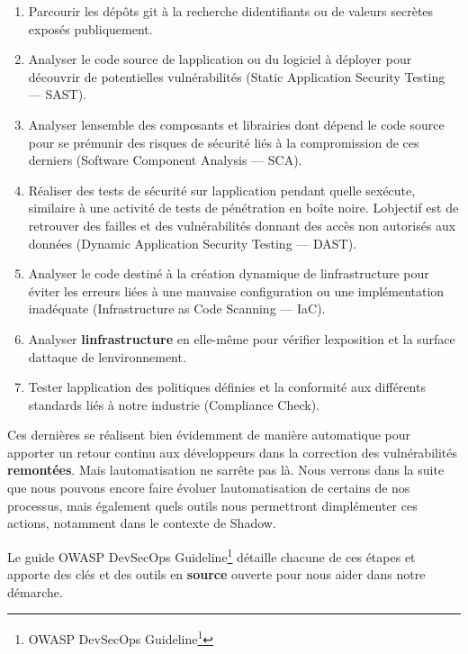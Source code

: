 \documentclass[
  11pt,
  a4paper,
  krantz2,
  11pt,
  oneside]{krantz}
\renewcommand{\href}[2]{#2\footnote{\url{#1}}}
\begin{document}
\begin{enumerate}
\def\labelenumi{\arabic{enumi}.}
\item
  Parcourir les dépôts git à la recherche d\textquotesingle identifiants ou de valeurs secrètes exposés publiquement.
\item
  Analyser le code source de l\textquotesingle application ou du logiciel à déployer pour découvrir de potentielles vulnérabilités (Static Application Security Testing --- SAST).
\item
  Analyser l\textquotesingle ensemble des composants et librairies dont dépend le code source pour se prémunir des risques de sécurité liés à la compromission de ces derniers (Software Component Analysis --- SCA).
\item
  Réaliser des tests de sécurité sur l\textquotesingle application pendant qu\textquotesingle elle s\textquotesingle exécute, similaire à une activité de tests de pénétration en boîte noire. L\textquotesingle objectif est de retrouver des failles et des vulnérabilités donnant des accès non autorisés aux données (Dynamic Application Security Testing --- DAST).
\item
  Analyser le code destiné à la création dynamique de l\textquotesingle infrastructure pour éviter les erreurs liées à une mauvaise configuration ou une implémentation inadéquate (Infrastructure as Code Scanning --- IaC).
\item
  Analyser \textbf{l\textquotesingle infrastructure} en elle-même pour vérifier l\textquotesingle exposition et la surface d\textquotesingle attaque de l\textquotesingle environnement.
\item
  Tester l\textquotesingle application des politiques définies et la conformité aux différents standards liés à notre industrie (Compliance Check).
\end{enumerate}

Ces dernières se réalisent bien évidemment de manière automatique pour apporter un retour continu aux développeurs dans la correction des vulnérabilités \textbf{remontées}. Mais l\textquotesingle automatisation ne s\textquotesingle arrête pas là. Nous verrons dans la suite que nous pouvons encore faire évoluer l\textquotesingle automatisation de certains de nos processus, mais également quels outils nous permettront d\textquotesingle implémenter ces actions, notamment dans le contexte de Shadow.

Le guide OWASP DevSecOps Guideline\footnote{\href{https://owasp.org/www-project-devsecops-guideline/}{OWASP DevSecOps Guideline}} détaille chacune de ces étapes et apporte des clés et des outils en \textbf{source} ouverte pour nous aider dans notre démarche.
\end{document}
